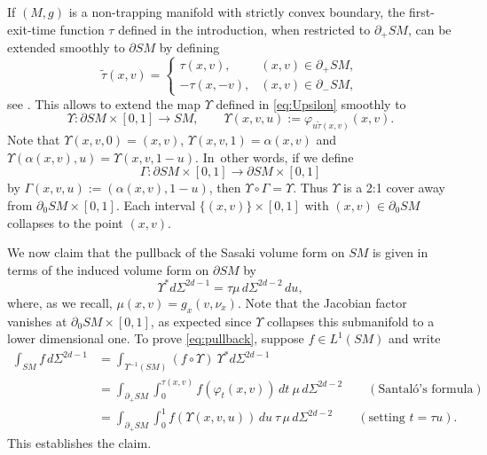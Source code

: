 \documentclass[JEP,XML,SOM,Unicode,NoFloatCountersInSection, NoEqCountersInSection,published]{cedram}
\theoremstyle{plain}
\theoremstyle{definition}
\theoremstyle{remark}
\def\t{\tilde{\tau}}
\newcommand{\del}{\partial}
\begin{document}
If $(M,g)$ is a non-trapping manifold with strictly convex boundary, the first-exit-time function $\tau$ defined in the introduction, when restricted to $\partial_+ SM$, can be extended smoothly to $\partial SM$ by defining
\begin{equation}
\tilde{\tau}(x,v)=
\begin{cases}
\tau(x,v), &(x,v)\in\partial_{+}SM,\\
-\tau(x,-v), &(x,v)\in\partial_{-}SM,
\end{cases}
\label{eq:ttau}
\end{equation}
see \eg \cite[Lem.\,3.2.6]{Paternain2021}. This allows to extend the map $\Upsilon$ defined in \eqref{eq:Upsilon} smoothly to
\[
\Upsilon:\partial SM\times [0,1]\to SM, \qquad \Upsilon(x,v,u):=\varphi_{u\t(x,v)}(x,v).
\]
Note that $\Upsilon(x,v,0)=(x,v)$, $\Upsilon(x,v,1)=\alpha(x,v)$
and \hbox{$\Upsilon(\alpha(x,v),u)=\Upsilon(x,v,1-u)$}. In~other words, if we define
\[
\Gamma:\partial SM\times [0,1]\to\partial SM \times [0,1]
\]
by
$\Gamma(x,v,u):=(\alpha(x,v),1-u)$, then $\Upsilon\circ \Gamma=\Upsilon$.
Thus $\Upsilon$ is a 2:1 cover away from $\partial_0 SM\times[0,1]$. Each interval $\{(x,v)\} \times [0,1]$
with $(x,v) \in \del_0 SM$ collapses to the point $(x,v)$.

We now claim that the pullback of the Sasaki volume form on $SM$ is given in terms of the induced volume form on $\partial SM$ by
\begin{equation}
\Upsilon^* d\Sigma^{2d-1} = \tau\mu\,d\Sigma^{2d-2}\,du,
\label{eq:pullback}
\end{equation}
where, as we recall, $\mu(x,v) = g_x(v, \nu_x)$. Note that the Jacobian factor vanishes at $\partial_0 SM \times [0,1]$, as expected
since $\Upsilon$ collapses this submanifold to a lower dimensional one. To prove \eqref{eq:pullback}, suppose $f\in L^1(SM)$ and write\vspace*{-3pt}
\begin{align*}
\int_{SM} f\,d\Sigma^{2d-1} &= \int_{\Upsilon^{-1} (SM)} (f\circ \Upsilon)\ \Upsilon^* d\Sigma^{2d-1}\\
&= \int_{\partial_+ SM} \int_0^{\tau(x,v)} f(\varphi_t(x,v))\,dt\ \mu \, d\Sigma^{2d-2} \qquad (\text{Santaló's formula}) \\
&
= \int_{\partial_+ SM} \int_0^1 f(\Upsilon(x,v,u)) \,du\ \tau \, \mu \, d\Sigma^{2d-2} \qquad (\text{setting } t = \tau u).
\end{align*}
This establishes the claim.
\end{document}

